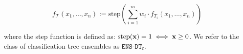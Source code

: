 
 \begin{equation}
\label{tree_ensemble_formulation_appendix}
    f_{\mathcal{T}}(x_{1}, \ldots, x_{n}) := \text{step}(\sum\limits_{i=1}^{m} w_{i} \cdot f_{T_{i}}(x_{1}, \ldots, x_{n}))
\end{equation}

where the step function is defined as: $\text{step}(\textbf{x}) = 1 \iff \textbf{x} \geq 0$. We refer to the class of classification tree ensembles as $\texttt{ENS-DT}_{\texttt{C}}$.


